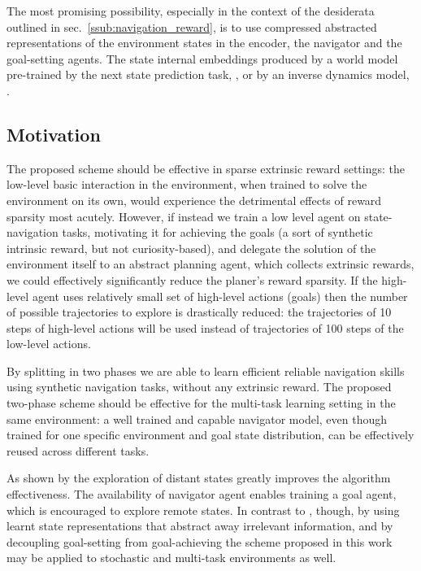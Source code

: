 \documentclass[acmsmall, nonacm]{acmart}
\begin{document}
The most promising possibility, especially in the context of the desiderata outlined in sec.~\ref{ssub:navigation_reward}, is to use compressed abstracted representations of the environment states in the encoder, the navigator and the goal-setting agents. The state internal embeddings produced by a world model pre-trained by the next state prediction task, \citep{ha_recurrent_2018}, or by an inverse dynamics model, \citep{badia_never_2020}.


\subsection{Motivation}

The proposed scheme should be effective in sparse extrinsic reward settings: the low-level basic interaction in the environment, when trained to solve the environment on its own, would experience the detrimental effects of reward sparsity most acutely. However, if instead we train a low level agent on state-navigation tasks, motivating it for achieving the goals (a sort of synthetic intrinsic reward, but not curiosity-based), and delegate the solution of the environment itself to an abstract planning agent, which collects extrinsic rewards, we could effectively significantly reduce the planer's reward sparsity. If the high-level agent uses relatively small set of high-level actions (goals) then the number of possible trajectories to explore is drastically reduced: the trajectories of 10 steps of high-level actions will be used instead of trajectories of 100 steps of the low-level actions.

By splitting in two phases we are able to learn efficient reliable navigation skills using synthetic navigation tasks, 
without any extrinsic reward.
%
The proposed two-phase scheme should be effective for the multi-task learning setting in the same environment: a well trained and capable navigator model, even though trained for one specific environment and goal state distribution, can be effectively reused across different tasks.

As shown by \citet{ecoffet_first_2021} the exploration of distant states greatly improves the algorithm effectiveness. The availability of navigator agent enables training a goal agent, which is encouraged to explore remote states.
%
In contrast to \citep{ecoffet_first_2021}, though, by using learnt state representations that abstract away irrelevant information, and by decoupling goal-setting from goal-achieving the scheme proposed in this work may be applied to stochastic and multi-task environments as well.
\end{document}
